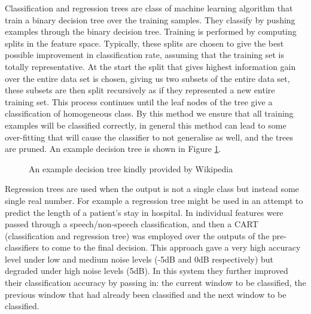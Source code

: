 \documentclass[ %
                    author={Sam Phippen},
                supervisor={Dr. Rafal Bogacz},
                     title={Real time voice activity detectors in noisy personal computing environments},
                  subtitle={},
                    degree={MEng},
                      year={2012} ]{thesis}
\begin{document}
Classification and regression trees are class of machine learning algorithm
that train a binary decision tree over the training samples. They classify by
pushing examples through the binary decision tree. Training is performed by
computing splits in the feature space. Typically, these splits are chosen to
give the best possible improvement in classification rate, assuming that the
training set is totally representative. At the start the split that gives
highest information gain over the entire data set is chosen, giving us two
subsets of the entire data set, these subsets are then split recursively as if
they represented a new entire training set. This process continues until the
leaf nodes of the tree give a classification of homogeneous class. By this
method we ensure that all training examples will be classified correctly, in
general this method can lead to some over-fitting that will cause the classifier
to not generalise as well, and the trees are pruned. An example decision tree
is shown in Figure \ref{fig:decision-tree}.

\begin{figure}


    \label{fig:decision-tree}
    \caption{An example decision tree kindly provided by Wikipedia}
\end{figure}

Regression trees are used when the output is not a single class but instead
some single real number. For example a regression tree might be used in an
attempt to predict the length of a patient's stay in hospital. In \cite{shin}
individual features were passed through a speech/non-speech classification, and
then a CART (classification and regression tree) was employed over the outputs
of the pre-classifiers to come to the final decision. This approach gave a very
high accuracy level under low and medium noise levels (-5dB and 0dB
respectively) but degraded under high noise levels (5dB). In this system they
further improved their classification accuracy by passing in: the current window
to be classified, the previous window that had already been classified and the
next window to be classified.
\end{document}
